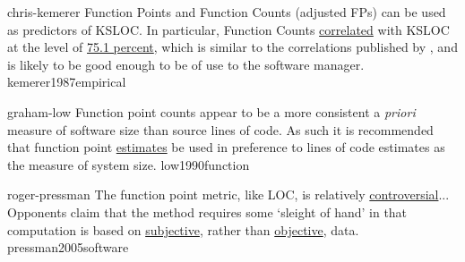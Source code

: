 \documentclass{article}
\begin{document}

\lnQuote
  {chris-kemerer}
  {Function Points and Function Counts (adjusted FPs) can be used as predictors of KSLOC. In particular, Function Counts \ul{correlated} with KSLOC at the level of \ul{75.1 percent}, which is similar to the correlations published by \citet{albrecht1983software}, and is likely to be good enough to be of use to the software manager.}
  {kemerer1987empirical}

\lnQuote
  {graham-low}
  {Function point counts appear to be a more consistent a \emph{priori} measure of software size than source lines of code. As such it is recommended that function point \ul{estimates} be used in preference to lines of code estimates as the measure of system size.}
  {low1990function}

\lnQuote
  {roger-pressman}
  {The function point metric, like LOC, is relatively \ul{controversial}... Opponents claim that the method requires some `sleight of hand' in that computation is based on \ul{subjective}, rather than \ul{objective}, data.}
  {pressman2005software}
\end{document}
